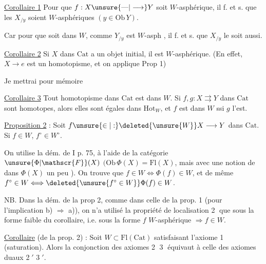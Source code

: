 \uline{Corollaire 1} Pour que $f:X\unsure{\text{---}|\longrightarrow}Y$ soit $W$-asphérique, il f. et s. que les $X_{/y}$ soient $W$-asphériques $(y\in\mathrm{Ob}\,Y)$.

Car pour que
soit dans $W$, comme $Y_{/y}$ est $W$-asph , il f. et s. que $X_{/y}$ le soit aussi.

 \uline{Corollaire 2} Si $X$ dans $\mathrm{Cat}$ a un objet initial, il est $W$-asphérique. (En effet, $X\longrightarrow e$ est un homotopisme, et on applique Prop 1)


Je mettrai pour mémoire

\uline{Corollaire 3} Tout homotopisme dans $\mathrm{Cat}$ est dans $W$. Si $f,g:X\rightrightarrows Y$  dans $\mathrm{Cat}$ sont homotopes, alors elles sont égales dans $\mathrm{Hot}_W$, et $f$ est dans $W$ ssi $g$ l'est.

\uline{Proposition 2} : Soit $f\unsure{\in|:}\deleted{\unsure{W}}X\longrightarrow Y$ dans $\mathrm{Cat}$. Si $f\in W$, $f^\circ\in W^\circ$.

On utilise la dém. de I p. 75, à l'aide de la catégorie  $\unsure{\Phi|\mathscr{F}}(X)$ $(\mathrm{Ob}\,\Phi(X)=\mathrm{Fl}(X)$, mais avec une notion de  dans $\Phi(X)$ un peu ). On trouve que $f\in W\Longleftrightarrow\Phi(f)\in W$, et de même $f^\circ\in W\Longleftrightarrow\deleted{\unsure{f^\circ\in W}}\Phi(f)\in W$.

NB. Dans la dém. de la prop 2, comme dans celle de la prop. 1 (pour l'implication b) $\Rightarrow$ a)), on n'a utilisé la propriété de localisation \textcircled{2} que sous la forme faible du corollaire, i.e.  sous la forme $f$ $W$-asphérique $\Rightarrow f\in W$.


\uline{Corollaire} (de la prop. 2) : Soit $W\subset\mathrm{Fl}(\mathrm{Cat})$ satisfaisant l'axiome \textcircled{1} (saturation). Alors la conjonction des axiomes \textcircled{2} \textcircled{3} équivaut à celle des axiomes duaux \textcircled{2$'$} \textcircled{3$'$}.


